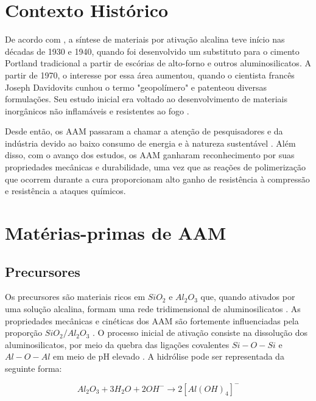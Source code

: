 \section{Contexto Histórico}

De acordo com \cite{pachecotorgal2014handbook}, a síntese de materiais por ativação alcalina teve início nas décadas de 1930 e 1940, quando foi desenvolvido um substituto para o cimento Portland tradicional a partir de escórias de alto-forno e outros aluminosilicatos.
A partir de 1970, o interesse por essa área aumentou, quando o cientista francês Joseph Davidovits cunhou o termo "geopolímero" e patenteou diversas formulações. Seu estudo inicial era voltado ao desenvolvimento de materiais inorgânicos não inflamáveis e resistentes ao fogo \cite{provis2009geopolymers}.

Desde então, os AAM passaram a chamar a atenção de pesquisadores e da indústria devido ao baixo consumo de energia e à natureza sustentável \cite{qin2022onepart}.
Além disso, com o avanço dos estudos, os AAM ganharam reconhecimento por suas propriedades mecânicas e durabilidade, uma vez que as reações de polimerização que ocorrem durante a cura proporcionam alto ganho de resistência à compressão e resistência a ataques químicos.

\section{Matérias-primas de AAM}

\subsection{Precursores}

Os precursores são materiais ricos em $SiO_2$ e $Al_2O_3$ que, quando ativados por uma solução alcalina, formam uma rede tridimensional de aluminosilicatos \cite{rakhimova2019metakaolin}.
As propriedades mecânicas e cinéticas dos AAM são fortemente influenciadas pela proporção $SiO_2/Al_2O_3$ \cite{provis2007geopolymerisation}.
O processo inicial de ativação consiste na dissolução dos aluminosilicatos, por meio da quebra das ligações covalentes $Si-O-Si$ e $Al-O-Al$ em meio de pH elevado \cite{Severo2013}. A hidrólise pode ser representada da seguinte forma:

\begin{equation}
  Al_2O_3 + 3H_2O + 2OH^- \rightarrow 2\left[Al(OH)_4\right]^- 
\end{equation}

